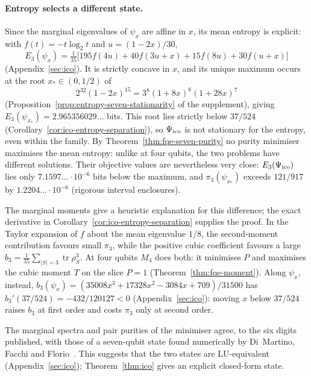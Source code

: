 \paragraph{Entropy selects a different state.} Since the marginal eigenvalues of $\psi_x$ are affine in $x$, its mean entropy
is explicit: with $f(t)=-t\log_2t$ and $u=(1-2x)/30$,
\[
 E_3(\psi_x)=\tfrac1{35}\bigl[195f(4u)+40f(3u+x)+15f(8u)+30f(u+x)\bigr]
\]
(Appendix~\ref{sec:ico}). It is strictly concave in $x$, and its unique maximum occurs at the root $x_*\in(0,1/2)$ of
\begin{equation}\label{eq:fqe-xstar}
 2^{32}(1-2x)^{15}=3^8(1+8x)^8(1+28x)^7
\end{equation}
(Proposition~\ref{prop:entropy-seven-stationarity} of the supplement),
giving $E_3(\psi_{x_*})=2.965356029\ldots$ bits. This root lies strictly below $37/524$
(Corollary~\ref{cor:ico-entropy-separation}), so $\Psi_{\mathrm{ico}}$ is not stationary for the entropy, even within the family.
By Theorem~\ref{thm:fqe-seven-purity} no purity minimiser maximises the mean entropy: unlike at four qubits, the two
problems have different solutions. Their objective values are nevertheless very close: $E_3(\Psi_{\mathrm{ico}})$ lies only $7.1597\ldots\cdot10^{-6}$ bits
below the maximum, and $\pi_3(\psi_{x_*})$ exceeds $121/917$ by $1.2204\ldots\cdot10^{-6}$ (rigorous interval enclosures).

The marginal moments give a heuristic explanation for this difference; the exact derivative in
Corollary~\ref{cor:ico-entropy-separation} supplies the proof. In the Taylor expansion of $f$ about the mean eigenvalue $1/8$,
the second-moment contribution favours small $\pi_3$, while the positive cubic coefficient favours a large
$b_3=\tfrac1{35}\sum_{|S|=3}\operatorname{tr}\rho_S^3$. At four qubits $M_4$ does both: it minimises $P$ and maximises
the cubic moment $T$ on the slice $P=1$ (Theorem~\ref{thm:fqe-moment}). Along $\psi_x$, instead,
$b_3(\psi_x)=(35008x^3+17328x^2-3084x+709)/31500$ has $b_3'(37/524)=-432/120127<0$ (Appendix~\ref{sec:ico}): moving
$x$ below $37/524$ raises $b_3$ at first order and costs $\pi_3$ only at second order.

The marginal spectra and pair purities of the minimiser agree, to the six digits published, with
those of a seven-qubit state found numerically by Di~Martino, Facchi and Florio~\cite{DMFF18}. This suggests that the two
states are LU-equivalent (Appendix~\ref{sec:ico}); Theorem~\ref{thm:ico} gives an explicit closed-form state.

